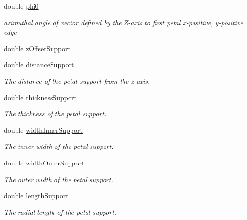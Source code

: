 \begin{DoxyCompactItemize}
double \hyperlink{struct_d_d4hep_1_1_d_d_rec_1_1_z_disk_petals_struct_1_1_layer_layout_a9f475e0e0241b8d7198b0c0a3511dd2f}{phi0}
\begin{DoxyCompactList}\small\item\em azimuthal angle of vector defined by the Z-\/axis to first petal x-\/positive, y-\/positive edge \end{DoxyCompactList}\item 
double \hyperlink{struct_d_d4hep_1_1_d_d_rec_1_1_z_disk_petals_struct_1_1_layer_layout_acce2801e94b24764955762c2a659e96b}{z\+Offset\+Support}
\item 
double \hyperlink{struct_d_d4hep_1_1_d_d_rec_1_1_z_disk_petals_struct_1_1_layer_layout_a2c3400e7a403bd903dfe542baaae4ead}{distance\+Support}
\begin{DoxyCompactList}\small\item\em The distance of the petal support from the z-\/axis. \end{DoxyCompactList}\item 
double \hyperlink{struct_d_d4hep_1_1_d_d_rec_1_1_z_disk_petals_struct_1_1_layer_layout_a49467ec112b66d8cf7be0276d2c0db9d}{thickness\+Support}
\begin{DoxyCompactList}\small\item\em The thickness of the petal support. \end{DoxyCompactList}\item 
double \hyperlink{struct_d_d4hep_1_1_d_d_rec_1_1_z_disk_petals_struct_1_1_layer_layout_ad2a842725740bd0d2e2bc412f9e54f02}{width\+Inner\+Support}
\begin{DoxyCompactList}\small\item\em The inner width of the petal support. \end{DoxyCompactList}\item 
double \hyperlink{struct_d_d4hep_1_1_d_d_rec_1_1_z_disk_petals_struct_1_1_layer_layout_ad5542ca1bb7f8141957104d4415fbb61}{width\+Outer\+Support}
\begin{DoxyCompactList}\small\item\em The outer width of the petal support. \end{DoxyCompactList}\item 
double \hyperlink{struct_d_d4hep_1_1_d_d_rec_1_1_z_disk_petals_struct_1_1_layer_layout_a67fb8540056b8f6523fefa061c7b5aa8}{length\+Support}
\begin{DoxyCompactList}\small\item\em The radial length of the petal support. \end{DoxyCompactList}\item 

\end{DoxyCompactItemize}
